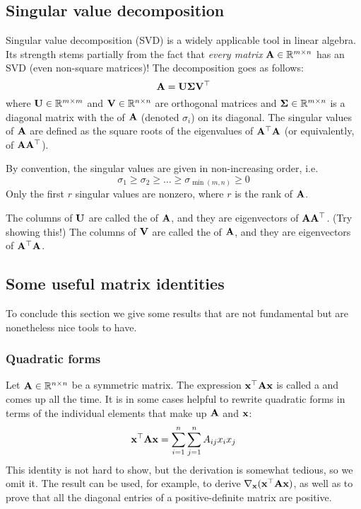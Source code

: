 \subsection{Singular value decomposition}
Singular value decomposition (SVD) is a widely applicable tool in linear algebra.
Its strength stems partially from the fact that \textit{every matrix} $\mathbf{A} \in \mathbb{R}^{m \times n}$ has an SVD (even non-square matrices)!
The decomposition goes as follows:
\[\mathbf{A} = \mathbf{U}\mathbf{\Sigma}\mathbf{V}^\top\]
where $\mathbf{U} \in \mathbb{R}^{m \times m}$ and $\mathbf{V} \in \mathbb{R}^{n \times n}$ are orthogonal matrices and $\mathbf{\Sigma} \in \mathbb{R}^{m \times n}$ is a diagonal matrix with the  of $\mathbf{A}$ (denoted $\sigma_i$) on its diagonal.
The singular values of $\mathbf{A}$ are defined as the square roots of the eigenvalues of $\mathbf{A}^\top\mathbf{A}$ (or equivalently, of $\mathbf{A}\mathbf{A}^\top$).

By convention, the singular values are given in non-increasing order, i.e.
\[\sigma_1 \geq \sigma_2 \geq \dots \geq \sigma_{\min(m,n)} \geq 0\]
Only the first $r$ singular values are nonzero, where $r$ is the rank of $\mathbf{A}$.

The columns of $\mathbf{U}$ are called the  of $\mathbf{A}$, and they are eigenvectors of $\mathbf{A}\mathbf{A}^\top$.
(Try showing this!)
The columns of $\mathbf{V}$ are called the  of $\mathbf{A}$, and they are eigenvectors of $\mathbf{A}^\top\mathbf{A}$.

\subsection{Some useful matrix identities}
To conclude this section we give some results that are not fundamental but are nonetheless nice tools to have.

\subsubsection{Quadratic forms}
Let $\mathbf{A} \in \mathbb{R}^{n \times n}$ be a symmetric matrix.
The expression $\mathbf{x}^\top\mathbf{A}\mathbf{x}$ is called a  and comes up all the time.
It is in some cases helpful to rewrite quadratic forms in terms of the individual elements that make up $\mathbf{A}$ and $\mathbf{x}$:
\[\mathbf{x}^\top\mathbf{A}\mathbf{x} = \sum_{i=1}^n\sum_{j=1}^n A_{ij}x_ix_j\]
This identity is not hard to show, but the derivation is somewhat tedious, so we omit it.
The result can be used, for example, to derive $\nabla_{\mathbf{x}}(\mathbf{x}^\top\mathbf{A}\mathbf{x})$, as well as to prove that all the diagonal entries of a positive-definite matrix are positive.

